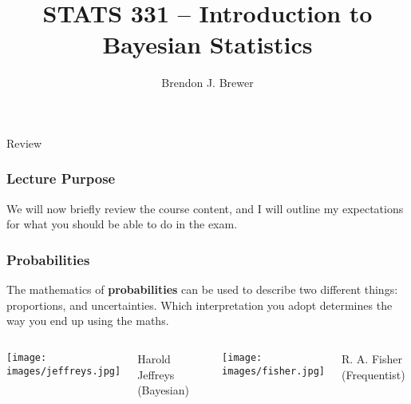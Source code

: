 \documentclass{beamer}
\author{Brendon J. Brewer}
\title{STATS 331 -- Introduction to Bayesian Statistics}
\institute{The University of Auckland}
\date{}
\begin{document}
\frame{\titlepage}

\begin{frame}
\Large

\begin{center}
Review
\end{center}
\end{frame}

\begin{frame}
\frametitle{Lecture Purpose}

We will now briefly review the course content, and I will outline my
expectations for what you should be able to do in the exam.

\end{frame}


\begin{frame}
\frametitle{Probabilities}
The mathematics of {\bf probabilities} can be used to describe two different
things: proportions, and uncertainties. Which interpretation you adopt
determines the way you end up using the maths.\pause

   \begin{columns} %

        \centering
        \texttt{[image: images/jeffreys.jpg]}

        Harold Jeffreys (Bayesian)

        \centering
        \texttt{[image: images/fisher.jpg]}

        R. A. Fisher (Frequentist)
     \end{columns}


\end{frame}
\end{document}
